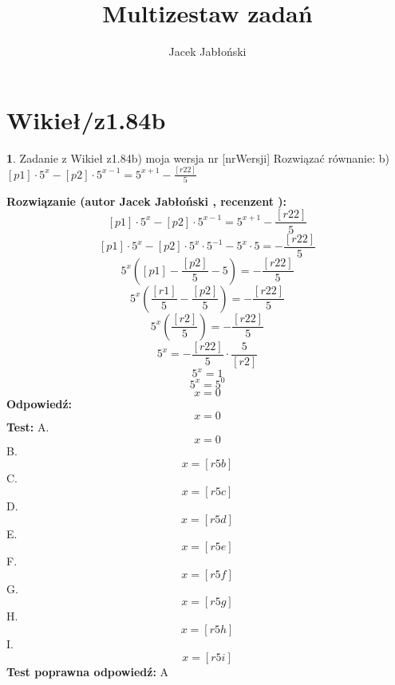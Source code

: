 \documentclass[12pt, a4paper]{article}
\title{Multizestaw zadań}
\author{Jacek Jabłoński}
\date{}
\theoremstyle{definition} %
\newtheorem{zad}{}
\newcommand{\kategoria}[1]{\section{#1}} %
\newcommand{\zadStart}[1]{\begin{zad}#1\newline} %
\newcommand{\zadStop}{\end{zad}}   %
\newcommand{\rozwStart}[2]{\noindent \textbf{Rozwiązanie (autor #1 , recenzent #2): }\newline} %
\newcommand{\rozwStop}{\newline}                                            %
\newcommand{\odpStart}{\noindent \textbf{Odpowiedź:}\newline}    %
\newcommand{\odpStop}{\newline}                                             %
\newcommand{\testStart}{\noindent \textbf{Test:}\newline} %
\newcommand{\testStop}{\newline} %
\newcommand{\kluczStart}{\noindent \textbf{Test poprawna odpowiedź:}\newline} %
\newcommand{\kluczStop}{\newline} %
\begin{document}
\maketitle


\kategoria{Wikieł/z1.84b}
\zadStart{Zadanie z Wikieł z1.84b) moja wersja nr [nrWersji]}
Rozwiązać równanie:
b) $[p1] \cdot 5^x - [p2] \cdot 5^{x-1} = 5^{x+1} - \frac{[r22]}{5}$
\zadStop
\rozwStart{Jacek Jabłoński}{}
$$[p1] \cdot 5^x - [p2] \cdot 5^{x-1} = 5^{x+1} - \frac{[r22]}{5}$$
$$[p1] \cdot 5^x - [p2] \cdot 5^x \cdot 5^{-1} - 5^x \cdot 5 = - \frac{[r22]}{5}$$
$$5^x ( [p1] - \frac{[p2]}{5} - 5) = - \frac{[r22]}{5}$$
$$5^x ( \frac{[r1]}{5} - \frac{[p2]}{5} ) = -\frac{[r22]}{5} $$
$$5^x (\frac{[r2]}{5}) = -\frac{[r22]}{5} $$
$$5^x = -\frac{[r22]}{5} \cdot \frac{5}{[r2]} $$
$$5^x = 1 $$
$$5^x = 5^0$$
$$x=0$$
\rozwStop
\odpStart
$$x=0$$
\odpStop
\testStart
A. $$x = 0$$
B. $$x = [r5b]$$
C. $$x = [r5c]$$
D. $$x = [r5d]$$
E. $$x = [r5e]$$
F. $$x = [r5f]$$
G. $$x = [r5g]$$
H. $$x = [r5h]$$
I. $$x = [r5i]$$
\testStop
\kluczStart
A
\kluczStop
\end{document}
